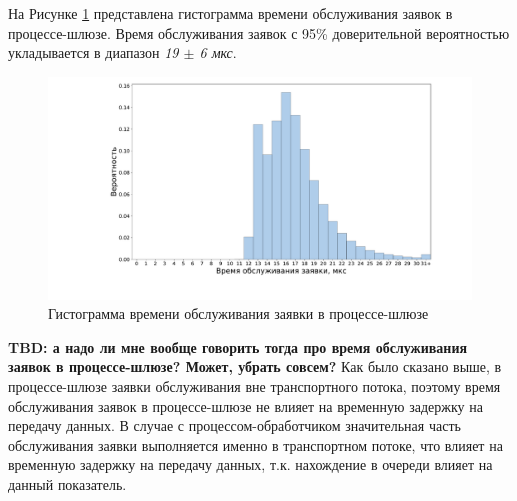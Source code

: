 На Рисунке \ref{chapter41:TRLatency} представлена гистограмма времени обслуживания заявок в процессе-шлюзе. Время обслуживания заявок с 95\% доверительной вероятностью укладывается в диапазон \textit{19 $\pm$ 6 мкс}.
\begin{figure}[!h]
\caption{Гистограмма времени обслуживания заявки в процессе-шлюзе}
\label{chapter41:TRLatency}
\includegraphics[width=\textwidth]{../../graphics/hist/TR}
\end{figure}

\textbf{TBD: а надо ли мне вообще говорить тогда про время обслуживания заявок в процессе-шлюзе? Может, убрать совсем?}
Как было сказано выше, в процессе-шлюзе заявки обслуживания вне транспортного потока, поэтому время обслуживания заявок в процессе-шлюзе не влияет на временную задержку на передачу данных. В случае с процессом-обработчиком значительная часть обслуживания заявки выполняется именно в транспортном потоке, что влияет на временную задержку на передачу данных, т.к. нахождение в очереди влияет на данный показатель.
